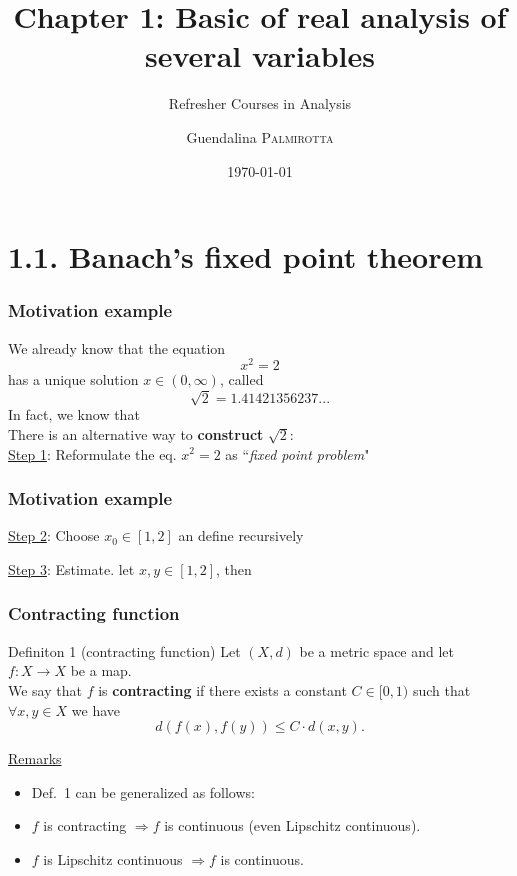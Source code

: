 \documentclass[10pt]{beamer}
\title[Refresher Courses in Analysis] %
{Chapter 1: Basic of real analysis of several variables}
\subtitle{Refresher Courses in Analysis}
\author[Guendalina \textsc{Palmirotta}]{Guendalina \textsc{Palmirotta}}
\institute[]{University of Luxembourg, Department of Mathematics}
\date[]{\today}
\newcommand{\nologo}{\setbeamertemplate{logo}{}}
\begin{document}
\begin{frame}
\titlepage
\end{frame}

{\nologo



\section{1.1.  Banach's fixed point theorem}

\begin{frame} \frametitle{Motivation example}
We already know that the equation 
$$x^2=2$$
has a unique solution $x\in (0,\infty)$, called 
$$\sqrt{2}=1.41421356237...$$
In fact, we know that \\
\vspace{0.2cm}
There is an alternative way to \textbf{construct} $\sqrt{2}$:\\
\vspace{0.2cm}
\underline{Step 1}: Reformulate the eq. $x^2=2$ as ``\textit{fixed point problem}"
\begin{block}{} 
\vspace{1cm}
\end{block}{}

\end{frame}

\begin{frame} \frametitle{Motivation example}
\underline{Step 2}: Choose $x_0 \in [1,2]$ an define recursively
\begin{block}{} 
\vspace{0.5cm}
\end{block}{}
\vspace{0.2cm}
\underline{Step 3}:
Estimate. let $x,y \in [1,2]$,  then 
\begin{block}{} 
\vspace{0.5cm}
\end{block}{}
\end{frame}

\begin{frame} \frametitle{Contracting function}
\begin{alertblock}{Definiton 1 (contracting function)}
Let $(X,d)$ be a metric space and let $f:X \rightarrow X$ be a map.\\
We say that $f$ is \textbf{contracting} if there exists a constant $C\in [0,1)$ such that $\forall x,y \in X$ we have
$$d(f(x),f(y)) \leq C\cdot d(x,y).$$
\end{alertblock}
\underline{Remarks}
\begin{itemize}
\item Def.~1 can be generalized as follows:\\
\vspace{2cm}
\item $f$ is contracting $\Rightarrow f$ is continuous (even Lipschitz continuous).
\item $f$ is Lipschitz continuous $\Rightarrow f$ is continuous.
\end{itemize}
\end{frame}

}
\end{document}
